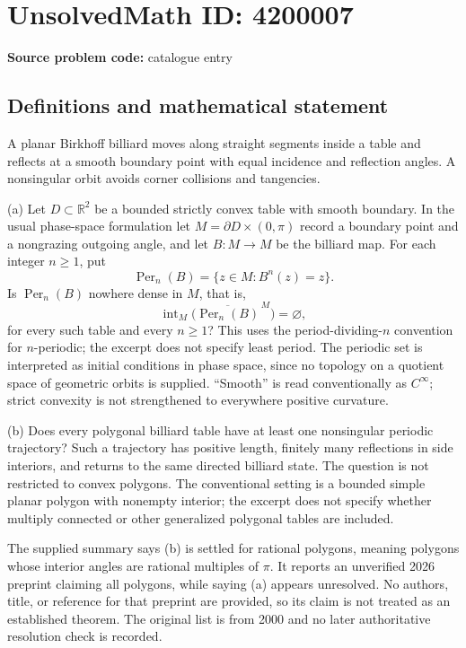 \documentclass[11pt]{article}
\begin{document}
\section*{UnsolvedMath ID: 4200007}
\textbf{Source problem code:} catalogue entry
\subsection{Definitions and mathematical statement}
A planar Birkhoff billiard moves along straight segments inside a table and reflects at a smooth boundary point with equal incidence and reflection angles. A nonsingular orbit avoids corner collisions and tangencies.

(a) Let \(D\subset\mathbb R^2\) be a bounded strictly convex table with smooth boundary. In the usual phase-space formulation let \(M=\partial D\times(0,\pi)\) record a boundary point and a nongrazing outgoing angle, and let \(B:M\to M\) be the billiard map. For each integer \(n\ge1\), put
\[
 \operatorname{Per}_n(B)=\{z\in M:B^n(z)=z\}.
\]
Is \(\operatorname{Per}_n(B)\) nowhere dense in \(M\), that is,
\[
 \operatorname{int}_M\bigl(\overline{\operatorname{Per}_n(B)}^{\,M}\bigr)=\varnothing,
\]
for every such table and every \(n\ge1\)? This uses the period-dividing-\(n\) convention for \(n\)-periodic; the excerpt does not specify least period. The periodic set is interpreted as initial conditions in phase space, since no topology on a quotient space of geometric orbits is supplied. ``Smooth'' is read conventionally as \(C^\infty\); strict convexity is not strengthened to everywhere positive curvature.

(b) Does every polygonal billiard table have at least one nonsingular periodic trajectory? Such a trajectory has positive length, finitely many reflections in side interiors, and returns to the same directed billiard state. The question is not restricted to convex polygons. The conventional setting is a bounded simple planar polygon with nonempty interior; the excerpt does not specify whether multiply connected or other generalized polygonal tables are included.

The supplied summary says (b) is settled for rational polygons, meaning polygons whose interior angles are rational multiples of \(\pi\). It reports an unverified 2026 preprint claiming all polygons, while saying (a) appears unresolved. No authors, title, or reference for that preprint are provided, so its claim is not treated as an established theorem. The original list is from 2000 and no later authoritative resolution check is recorded.
\end{document}
